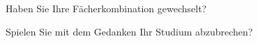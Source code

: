 \vspace{-.35cm}
\separate
\vspace{-.35cm}

\begin{choicequestion}[1]{Haben Sie Ihre Fächerkombination gewechselt?}
\end{choicequestion}

\vspace{-.15cm}
\separate
\vspace{-.35cm}

\begin{choicequestion}[1]{Spielen Sie mit dem Gedanken Ihr Studium abzubrechen?}
\end{choicequestion}

\vspace{-.1cm}
